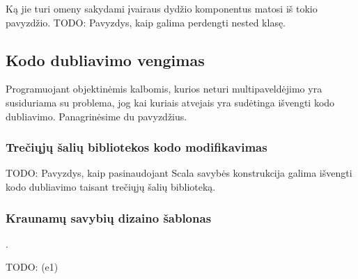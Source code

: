 Ką jie turi omeny sakydami įvairaus dydžio komponentus matosi
iš tokio pavyzdžio.
TODO: Pavyzdys, kaip galima perdengti nested klasę.

\subsection{Kodo dubliavimo vengimas}

Programuojant objektinėmis kalbomis, kurios neturi multipaveldėjimo
yra susiduriama su problema, jog kai kuriais atvejais yra sudėtinga
išvengti kodo dubliavimo. Panagrinėsime du pavyzdžius.

\subsubsection{Trečiųjų šalių bibliotekos kodo modifikavimas}

TODO: Pavyzdys, kaip pasinaudojant Scala savybės  konstrukcija
galima išvengti kodo dubliavimo taisant trečiųjų šalių biblioteką.

\subsubsection{Kraunamų savybių dizaino šablonas}

\cite[267p.]{programming-in-scala}.

TODO: (e1)
